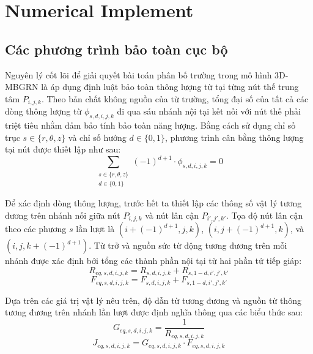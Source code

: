 \section{Numerical Implement}


\subsection{Các phương trình bảo toàn cục bộ}

Nguyên lý cốt lõi để giải quyết bài toán phân bố trường trong mô hình 3D-MBGRN là áp dụng định luật bảo toàn thông lượng từ tại từng nút thế trung tâm $P_{i,j,k}$. Theo bản chất không nguồn của từ trường, tổng đại số của tất cả các dòng thông lượng từ $\phi_{s,d,i,j,k}$ đi qua sáu nhánh nội tại kết nối với nút thế phải triệt tiêu nhằm đảm bảo tính bảo toàn năng lượng. Bằng cách sử dụng chỉ số trục $s \in \{r, \theta, z\}$ và chỉ số hướng $d \in \{0, 1\}$, phương trình cân bằng thông lượng tại nút được thiết lập như sau:
\begin{equation}
    \sum_{\substack{s \in \{r, \theta, z\} \\ d \in \{0, 1\}}} (-1)^{d+1} \cdot \phi_{s,d,i,j,k} = 0
\end{equation}

Để xác định dòng thông lượng, trước hết ta thiết lập các thông số vật lý tương đương trên nhánh nối giữa nút $P_{i,j,k}$ và nút lân cận $P_{i',j',k'}$. Tọa độ nút lân cận theo các phương $s$ lần lượt là $(i + (-1)^{d+1}, j, k)$, $(i, j + (-1)^{d+1}, k)$, và $(i, j, k + (-1)^{d+1})$. Từ trở và nguồn sức từ động tương đương trên mỗi nhánh được xác định bởi tổng các thành phần nội tại từ hai phần tử tiếp giáp:
\begin{equation}
    R_{eq,s,d,i,j,k} = R_{s,d,i,j,k} + R_{s,1-d,i',j',k'}
\end{equation}
\begin{equation}
    F_{eq,s,d,i,j,k} = F_{s,d,i,j,k} + F_{s,1-d,i',j',k'}
\end{equation}

Dựa trên các giá trị vật lý nêu trên, độ dẫn từ tương đương và nguồn từ thông tương đương trên nhánh lần lượt được định nghĩa thông qua các biểu thức sau:
\begin{equation}
    G_{eq,s,d,i,j,k} = \frac{1}{R_{eq,s,d,i,j,k}}
\end{equation}
\begin{equation}
    J_{eq,s,d,i,j,k} = G_{eq,s,d,i,j,k} \cdot F_{eq,s,d,i,j,k}
\end{equation}


